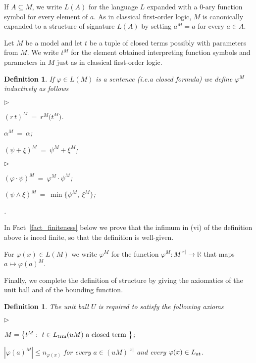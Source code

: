 \documentclass[12pt,letterpaper,oneside,reqno]{amsart}
\newcommand{\mylabel}[1]{{#1}\hfill}
\renewenvironment{itemize}
  {\begin{list}{$\triangleright$}{%
   \setlength{\parskip}{0mm}
   \setlength{\topsep}{.2\baselineskip}
   \setlength{\rightmargin}{0mm}
   \setlength{\listparindent}{0mm}
   \setlength{\itemindent}{0mm}
   \setlength{\labelwidth}{3ex}
   \setlength{\itemsep}{.2\baselineskip}
   \setlength{\parsep}{.2\baselineskip}
   \setlength{\partopsep}{0mm}
   \setlength{\labelsep}{1ex}
   \setlength{\leftmargin}{\labelwidth+\labelsep}
   \let\makelabel\mylabel}}{%
   \end{list}}
\theoremstyle{plain}
\newtheorem{definition}[theorem]{Definition}
\theoremstyle{remark}
\begin{document}
If $A\subseteq M$, we write $L(A)$ for the language $L$ expanded with a $0$-ary function symbol for every element of $a$.
As in classical first-order logic, $M$ is canonically expanded to a structure of signature $L(A)$ by setting $a^M=a$ for every $a\in A$.

Let $M$ be a model and let $t$ be a tuple of closed terms possibly with parameters from $M$.
We write $t^M$ for the element obtained interpreting function symbols and parameters in $M$ just as in classical first-order logic.

\begin{definition}\label{def_semantic}
If $\varphi\in L(M)$ is a sentence (i.e.\@ a closed formula) we define $\varphi^M$ inductively as follows

\begin{minipage}[t]{.5\textwidth}
\begin{itemize}
\item[i.] $(r\,t)^M\ =\  r^M\big(t^M\big)$.
\item[ii.] $\alpha^M\ =\ \alpha$;
\item[iii.] $(\psi+\xi)^M\ =\ \psi^M+\xi^M$;
\end{itemize}
\end{minipage}
\begin{minipage}[t]{.4\textwidth}
\begin{itemize}
\item[iv.] $(\varphi\cdot\psi)^M\ =\ \varphi^M\cdot\psi^M$;
\item[v.] $(\psi\wedge\xi)^M\ =\ \min\big\{\psi^M,\ \xi^M\big\}$; 
\item[vi.] \noindent{}.
\end{itemize}
\end{minipage}
\end{definition}
\medskip

In Fact~\ref{fact_finiteness} below we prove that the infimum in (vi) of the definition above is ineed finite, so that the definition is well-given.

For $\varphi(x)\in L(M)$ we write $\varphi^M$ for the function $\varphi^M:M^{|x|}\to{\mathds R}$ that maps $a\mapsto\varphi(a)^M$.

Finally, we complete the definition of structure by giving the axiomatics of the unit ball and of the bounding function.

\begin{definition}\label{def_unitball}
  The unit ball $U$ is required to satisfy the following axioms 
  \begin{itemize}
  \item[1.] $M=\big\{t^M:\ t\in L_{\rm trm}(uM) \textrm{ a closed term }\big\}$;
  \item[2.] $|\varphi(a)^M|\le n_{\varphi(x)}$ for every $a\in (uM)^{|x|}$ and every $\varphi(x)\in L_{\rm at}$.
  \end{itemize}
\end{definition}
\end{document}
